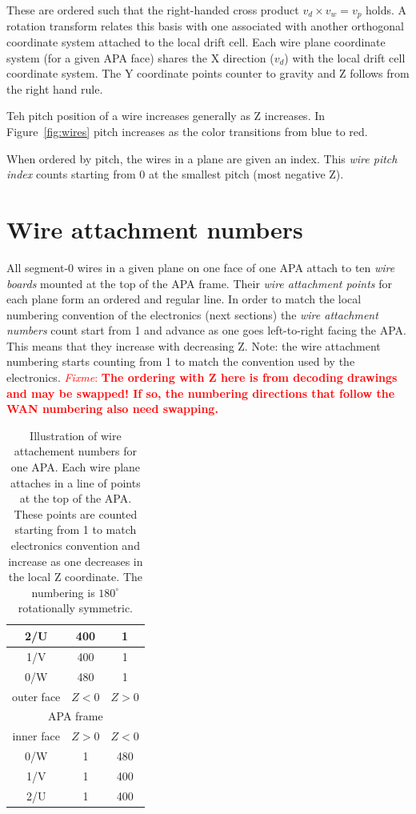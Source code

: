 \documentclass[pdftex,12pt,letter]{article}
\newcommand{\fixme}[1]{\textcolor{red}{\textit{Fixme}: \textbf{#1}}}
\begin{document}
These are ordered such that the right-handed cross product
$v_d \times v_w = v_p$ holds.  A rotation transform relates this basis
with one associated with another orthogonal coordinate system attached
to the local drift cell.  Each wire plane coordinate system (for a
given APA face) shares the X direction ($v_d$) with the local drift
cell coordinate system.  The Y coordinate points counter to gravity
and Z follows from the right hand rule.

Teh pitch position of a wire increases generally as Z increases.  In
Figure~\ref{fig:wires} pitch increases as the color transitions from
blue to red.

When ordered by pitch, the wires in a plane are given an index.  This
\textit{wire pitch index} counts starting from 0 at the smallest pitch
(most negative Z).

\section{Wire attachment numbers}

All segment-0 wires in a given plane on one face of one APA attach to
ten \textit{wire boards} mounted at the top of the APA frame.  Their
\textit{wire attachment points} for each plane form an ordered and
regular line.  In order to match the local numbering convention of the
electronics (next sections) the \textit{wire attachment numbers} count
start from 1 and advance as one goes left-to-right facing the APA.
This means that they increase with decreasing Z.  Note: the wire
attachment numbering starts counting from 1 to match the convention
used by the electronics. \fixme{The ordering with Z here is from decoding
  drawings and may be swapped!  If so, the numbering directions that
  follow the WAN numbering also need swapping.}

\begin{table}[htp]
  \centering
  \begin{tabular}[h]{ccc}
    \hline
    2/U & 400 & 1 \\
    \hline
    1/V & 400 & 1 \\
    \hline
    0/W & 480 & 1 \\
    \hline
    outer face & $Z<0$  & $Z>0$\\
    \hline
    \multicolumn{3}{|c|}{APA frame}\\
    \hline
    inner face & $Z>0$ & $Z<0$\\
    \hline
    0/W & 1 & 480 \\
    \hline
    1/V & 1 & 400 \\
    \hline
    2/U & 1 & 400 \\
    \hline
  \end{tabular}
  \caption{Illustration of wire attachement numbers for one APA.  Each wire plane attaches in a line of points at the top of the APA.  These points are counted starting from 1 to match electronics convention and increase as one decreases in the local Z coordinate.  The numbering is $180^\circ$ rotationally symmetric.}
  \label{tab:wan}
\end{table}
\end{document}
